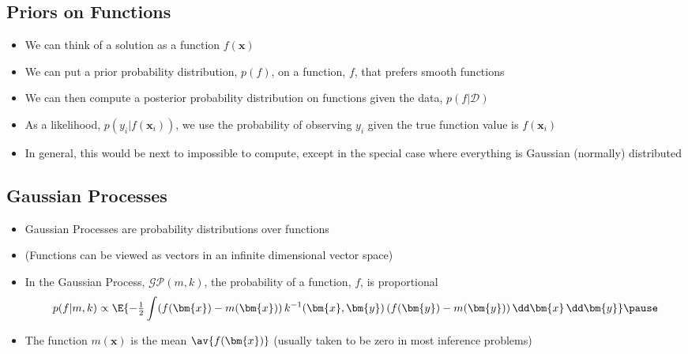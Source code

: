 \begin{slide}
\section{Priors on Functions}

\begin{PauseHighLight}
  \begin{itemize}
  \item We can think of a solution as a function $f(\bm{x})$\pause
  \item We can put a prior probability distribution, $p(f)$, on a
    function, $f$, that prefers smooth functions\pause
  \item We can then compute a posterior probability distribution on
    functions given the data, $p(f|\mathcal{D})$\pause
  \item As a likelihood, $p\left(y_i|f(\bm{x}_i)\right)$, we use the
    probability of observing $y_i$ given the true function value is
    $f(\bm{x}_i)$\pause
  \item In general, this would be next to impossible to compute\pause,
    except in the special case where everything is Gaussian (normally)
    distributed\pauseb
  \end{itemize}
\end{PauseHighLight}

\end{slide}


\begin{slide}
\section{Gaussian Processes}

\begin{PauseHighLight}
  \begin{itemize}
  \item Gaussian Processes are probability distributions over
    functions\pause
  \item (Functions can be viewed as vectors in an infinite dimensional
    vector space)\pause
  \item In the Gaussian Process, $\mathcal{GP}(m, k)$, the probability of
    a function, $f$, is proportional
    \begin{align*}
      p(f|m,k) \propto \E{-\tfrac{1}{2} \int (f(\bm{x})-m(\bm{x})) 
      \, k^{-1}(\bm{x},\bm{y}) \, (f(\bm{y}) -m(\bm{y})) \, \dd \bm{x}
      \, \dd \bm{y}}\pause
    \end{align*}
  \item The function $m(\bm{x})$ is the mean $\av{f(\bm{x})}$ (usually
    taken to be zero in most inference problems)\pause
  \end{itemize}
\end{PauseHighLight}


\end{slide}

